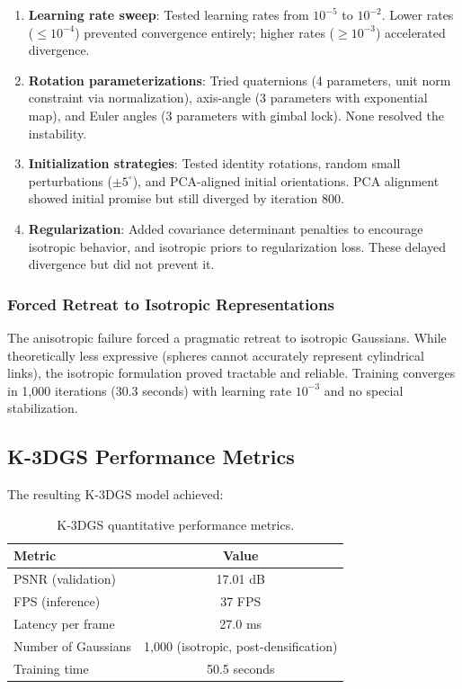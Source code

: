 \documentclass[12pt,a4paper,oneside]{report}
\begin{document}
\begin{enumerate}
    \item \textbf{Learning rate sweep}: Tested learning rates from $10^{-5}$ to $10^{-2}$. Lower rates ($\leq 10^{-4}$) prevented convergence entirely; higher rates ($\geq 10^{-3}$) accelerated divergence.
    \item \textbf{Rotation parameterizations}: Tried quaternions (4 parameters, unit norm constraint via normalization), axis-angle (3 parameters with exponential map), and Euler angles (3 parameters with gimbal lock). None resolved the instability.
    \item \textbf{Initialization strategies}: Tested identity rotations, random small perturbations ($\pm5^\circ$), and PCA-aligned initial orientations. PCA alignment showed initial promise but still diverged by iteration 800.
    \item \textbf{Regularization}: Added covariance determinant penalties to encourage isotropic behavior, and isotropic priors to regularization loss. These delayed divergence but did not prevent it.
\end{enumerate}

\subsubsection{Forced Retreat to Isotropic Representations}
\label{subsubsec:forced_retreat_to_isotropic_representations}

The anisotropic failure forced a pragmatic retreat to isotropic Gaussians. While theoretically less expressive (spheres cannot accurately represent cylindrical links), the isotropic formulation proved tractable and reliable. Training converges in 1,000 iterations (30.3 seconds) with learning rate $10^{-3}$ and no special stabilization.

\subsection{K-3DGS Performance Metrics}
\label{subsec:k_3dgs_performance_metrics}

The resulting K-3DGS model achieved:

\begin{table}[H]
\centering
\caption{K-3DGS quantitative performance metrics.}
\label{tab:k3dgs_performance}
\begin{tabular}{lc}
\toprule
Metric & Value \\
\midrule
PSNR (validation) & 17.01 dB \\
FPS (inference) & 37 FPS \\
Latency per frame & 27.0 ms \\
Number of Gaussians & 1,000 (isotropic, post-densification) \\
Training time & 50.5 seconds \\
\bottomrule
\end{tabular}
\end{table}
\end{document}
